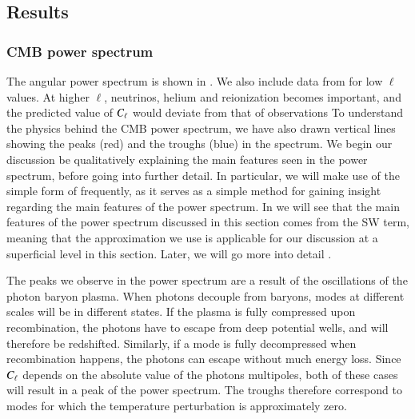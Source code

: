 \subsection{Results}\label{ssec:M4:results}


\subsubsection{CMB power spectrum} \label{sssec:M4:results:angular_power_spectrum}
The angular power spectrum is shown in . We also include data from \cite{Planck2020} for low $\ell$ values. At higher $\ell$, neutrinos, helium and reionization becomes important, and the predicted value of $C_\ell$ would deviate from that of observations  To understand the physics behind the CMB power spectrum, we have also drawn vertical lines showing the peaks (red) and the troughs (blue) in the spectrum. We begin our discussion be qualitatively explaining the main features seen in the power spectrum, before going into further detail. In particular, we will make use of the simple form of  frequently, as it serves as a simple method for gaining insight regarding the main features of the power spectrum.  In  we will see that the main features of the power spectrum discussed in this section comes from the SW term, meaning that the approximation we use is applicable for our discussion at a superficial level in this section. Later, we will go more into detail .      

The peaks we observe in the power spectrum are a result of the oscillations of the photon baryon plasma. When photons decouple from baryons, modes at different scales will be in different states. If the plasma is fully compressed upon recombination, the photons have to escape from deep potential wells, and will therefore be redshifted. Similarly, if a mode is fully decompressed when recombination happens, the photons can escape without much energy loss. Since $C_\ell$ depends on the absolute value of the photons multipoles, both of these cases will result in a peak of the power spectrum. The troughs therefore correspond to modes for which the temperature perturbation is approximately zero.  

